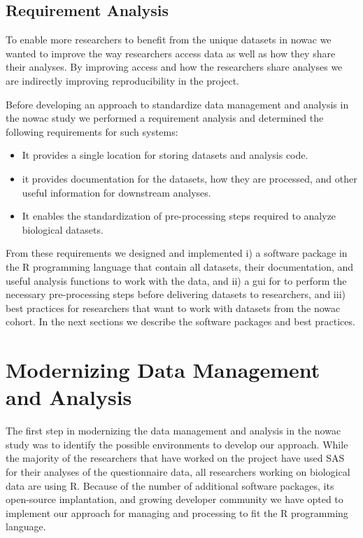 \subsection{Requirement Analysis} 
To enable more researchers to benefit from the unique datasets in \gls{nowac} we
wanted to improve the way researchers access data as well as how they share
their analyses. By improving access and how the researchers share analyses we
are indirectly improving reproducibility in the project. 

Before developing an approach to standardize data management and analysis in the
\gls{nowac} study we performed a requirement analysis and determined the
following requirements for such systems: 

\begin{itemize} 
    \item It provides a single location for storing datasets and analysis code.
    \item it provides documentation for the datasets, how they are processed,
    and other useful information for downstream analyses. 
    \item It enables the standardization of pre-processing steps required to
    analyze biological datasets. 
\end{itemize}

From these requirements we designed and implemented i) a software package in the
R programming language that contain all datasets, their documentation, and
useful analysis functions to work with the data, and ii) a \gls{gui} for
to perform the necessary pre-processing steps before delivering
datasets to researchers, and iii) 
best practices for researchers that want to work with datasets from the
\gls{nowac} cohort. 
In the next sections we describe the software packages and best practices. 


\section{Modernizing Data Management and Analysis} 
The first step in modernizing the data management and analysis in the
\gls{nowac} study was to identify the possible environments to develop our
approach. While the majority of the researchers that have worked on the project
have used SAS for their analyses of the questionnaire data, all researchers
working on biological data are using R. Because of the number of additional
software  packages, its open-source implantation, and growing developer
community we have opted to implement our approach for managing and processing to
fit the R programming language. 

